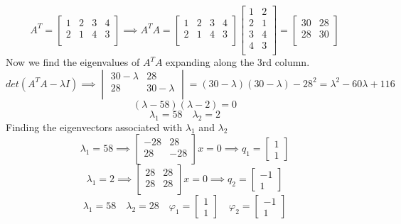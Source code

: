 \documentclass{article}
\begin{document}
\begin{enumerate}[1)]
$$A^T
=
\begin{bmatrix}
1 & 2 & 3 & 4 \\
2 & 1 & 4 & 3 \\
\end{bmatrix}
\implies
A^TA
=
\begin{bmatrix}
1 & 2 & 3 & 4 \\
2 & 1 & 4 & 3 \\
\end{bmatrix}
\begin{bmatrix}
1 & 2 \\
2 & 1 \\
3 & 4 \\
4 & 3 \\
\end{bmatrix}
=
\begin{bmatrix}
30 & 28 \\
28 & 30 \\
\end{bmatrix}
$$
Now we find the eigenvalues of $A^TA$ expanding along the 3rd column.
$$
det(A^TA - \lambda I)
\implies
\begin{vmatrix}
30 -\lambda & 28 \\
28 & 30 - \lambda \\
\end{vmatrix}
=(30-\lambda)(30-\lambda) - 28^2
=\lambda^2 -60\lambda + 116
$$
$$
(\lambda-58)(\lambda-2) = 0
$$
$$ \lambda_1 = 58 \quad \lambda_2 = 2 $$
Finding the eigenvectors associated with $\lambda_1$ and $\lambda_2$
$$\lambda_1 = 58 \implies
\begin{bmatrix}
-28 & 28 \\
28 & - 28 \\
\end{bmatrix}
x=0
\implies
q_1
=
\begin{bmatrix}
1\\
1
\end{bmatrix}
$$
$$\lambda_1 = 2 \implies
\begin{bmatrix}
28 & 28 \\
28 & 28 \\
\end{bmatrix}
x=0
\implies
q_2
=
\begin{bmatrix}
-1\\
1
\end{bmatrix}
$$
$$
\lambda_1 = 58 \quad \lambda_2 = 28 \quad \varphi_1 = \begin{bmatrix} 1\\ 1 \end{bmatrix} \quad \varphi_2 = \begin{bmatrix}-1 \\ 1 \end{bmatrix}
$$



\end{enumerate}
\end{document}
